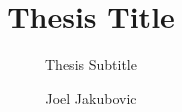 \documentclass[12pt]{report}
\title{Thesis Title}
\subtitle{Thesis Subtitle}
\author{Joel Jakubovic}
\begin{document}
\newcommand{\joel}[1]{}
\newcommand{\tomas}[1]{}
\newcommand{\note}[1]{}
\newcommand{\notes}[1]{}
\newcommand{\todo}[1]{\textbf{TODO: #1}}
\newcommand{\delete}[1]{\textbf{DELETE:}#1}
\newcommand{\naive}{na\"ive}
\providecommand{\tightlist}{}%
\newenvironment{longtable}[2]{\begin{tabular}}{\end{tabular}}
\newenvironment{head}{}{}









\appendix





\end{document}
